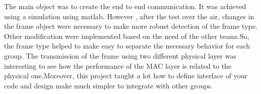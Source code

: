The main object was to create the end to end communication. It was achieved using a simulation using matlab. However , after the test over the air, changes in the frame object were necessary to make more robust detection of the frame type. Other modification were implemented based on the need of the other teams.So, the frame type helped to make easy to separate the necessary behavior for each group.
The transmission of the frame using two different physical layer was interesting  to see how the performance of the MAC layer is related to the physical one.Moreover, this project taught a lot how to define interface of your code and design make much simpler to integrate with other groups.  